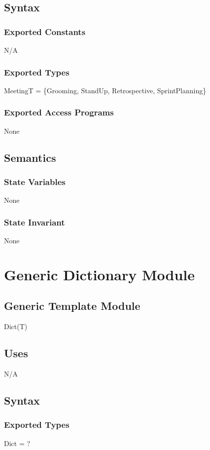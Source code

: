 \documentclass[12pt, titlepage]{article}
\begin{document}
\subsection*{Syntax}
\subsubsection*{Exported Constants}
N/A
\subsubsection*{Exported Types}
MeetingT = \{Grooming, StandUp, Retrospective, SprintPlanning\}
\subsubsection*{Exported Access Programs}
None

\subsection*{Semantics}
\subsubsection* {State Variables}
None
\subsubsection* {State Invariant}
None

\newpage

\section*{Generic Dictionary Module}
\subsection*{Generic Template Module}
Dict(T)

\subsection*{Uses}
N/A

\subsection*{Syntax}
\subsubsection*{Exported Types}
Dict = ?
\end{document}
